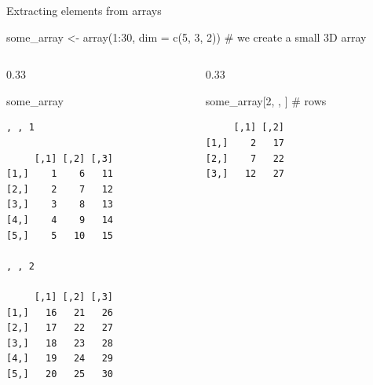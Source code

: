 \documentclass[
  ignorenonframetext,
  aspectratio=169,
]{beamer}
\newenvironment{Shaded}{\begin{snugshade}}{\end{snugshade}}
\newcommand{\AttributeTok}[1]{\textcolor[rgb]{0.40,0.45,0.13}{#1}}
\newcommand{\CommentTok}[1]{\textcolor[rgb]{0.37,0.37,0.37}{#1}}
\newcommand{\DecValTok}[1]{\textcolor[rgb]{0.68,0.00,0.00}{#1}}
\newcommand{\FunctionTok}[1]{\textcolor[rgb]{0.28,0.35,0.67}{#1}}
\newcommand{\NormalTok}[1]{\textcolor[rgb]{0.00,0.23,0.31}{#1}}
\newcommand{\OtherTok}[1]{\textcolor[rgb]{0.00,0.23,0.31}{#1}}
\newcommand{\SpecialCharTok}[1]{\textcolor[rgb]{0.37,0.37,0.37}{#1}}
\begin{document}
\begin{frame}[fragile]{Extracting elements from arrays}
\protect{}\label{extracting-elements-from-arrays}
\footnotesize

\begin{Shaded}
\begin{Highlighting}[]
\NormalTok{some\_array }\OtherTok{\textless{}{-}} \FunctionTok{array}\NormalTok{(}\DecValTok{1}\SpecialCharTok{:}\DecValTok{30}\NormalTok{, }\AttributeTok{dim =} \FunctionTok{c}\NormalTok{(}\DecValTok{5}\NormalTok{, }\DecValTok{3}\NormalTok{, }\DecValTok{2}\NormalTok{)) }\CommentTok{\# we create a small 3D array}
\end{Highlighting}
\end{Shaded}

\normalsize

\begin{columns}[T]
\begin{column}{0.33\linewidth}
\scriptsize

\begin{Shaded}
\begin{Highlighting}[]
\NormalTok{some\_array}
\end{Highlighting}
\end{Shaded}

\begin{verbatim}
, , 1

     [,1] [,2] [,3]
[1,]    1    6   11
[2,]    2    7   12
[3,]    3    8   13
[4,]    4    9   14
[5,]    5   10   15

, , 2

     [,1] [,2] [,3]
[1,]   16   21   26
[2,]   17   22   27
[3,]   18   23   28
[4,]   19   24   29
[5,]   20   25   30
\end{verbatim}

\normalsize
\end{column}

\begin{column}{0.33\linewidth}
\scriptsize

\begin{Shaded}
\begin{Highlighting}[]
\NormalTok{some\_array[}\DecValTok{2}\NormalTok{, , ] }\CommentTok{\# rows}
\end{Highlighting}
\end{Shaded}

\begin{verbatim}
     [,1] [,2]
[1,]    2   17
[2,]    7   22
[3,]   12   27
\end{verbatim}


\end{column}
\end{columns}
\end{frame}
\end{document}
